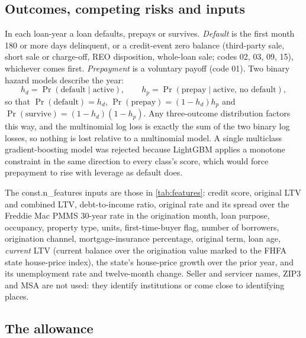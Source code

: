 \subsection{Outcomes, competing risks and inputs}

In each loan-year a loan defaults, prepays or survives. \emph{Default} is the
first month 180 or more days delinquent, or a credit-event zero balance
(third-party sale, short sale or charge-off, REO disposition, whole-loan
sale; codes 02, 03, 09, 15), whichever comes first. \emph{Prepayment} is a
voluntary payoff (code 01). Two binary hazard models describe the year:
\begin{equation}
h_d = \Pr(\text{default}\mid\text{active}),\qquad
h_p = \Pr(\text{prepay}\mid\text{active, no default}),
\end{equation}
so that $\Pr(\text{default})=h_d$, $\Pr(\text{prepay})=(1-h_d)h_p$ and
$\Pr(\text{survive})=(1-h_d)(1-h_p)$. Any three-outcome distribution factors
this way, and the multinomial log loss is exactly the sum of the two binary log
losses, so nothing is lost relative to a multinomial model. A single
multiclass gradient-boosting model was rejected because LightGBM applies a
monotone constraint in the same direction to every class's score, which would
force prepayment to rise with leverage as default does.

The \num{const.n_features} inputs are those in \cref{tab:features}: credit
score, original LTV and combined LTV, debt-to-income ratio, original rate and
its spread over the Freddie Mac PMMS 30-year rate in the origination month,
loan purpose, occupancy, property type, units, first-time-buyer flag, number
of borrowers, origination channel, mortgage-insurance percentage, original
term, loan age, \emph{current} LTV (current balance over the origination value
marked to the FHFA state house-price index), the state's house-price growth
over the prior year, and its unemployment rate and twelve-month change. Seller
and servicer names, ZIP3 and MSA are not used: they identify institutions or
come close to identifying places.

\subsection{The allowance}

